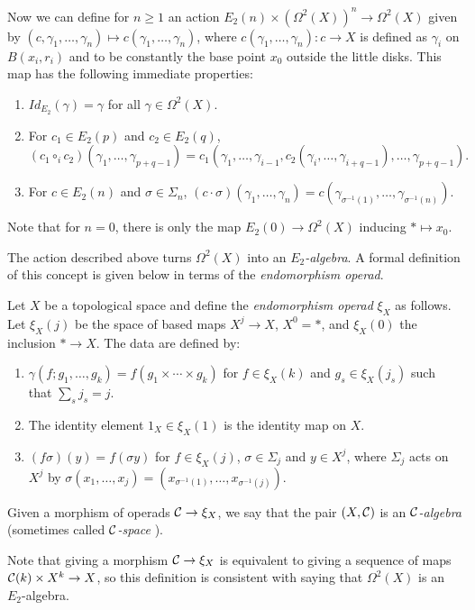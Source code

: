 \documentclass[TFM.tex]{subfiles}
\begin{document}
Now we can define for $n\geq 1$ an action $E_2(n)\times (\Omega^2(X))^n\to \Omega^2(X)$ given by $(c,\gamma_1,\dots, \gamma_n)\mapsto c(\gamma_1,\dots, \gamma_n)$, where 
$c(\gamma_1,\dots, \gamma_n):c\to X$ is defined as $\gamma_i$ on $B(x_i,r_i)$ and to be constantly the base point $x_0$ outside the little disks. This map has the following immediate properties:
\begin{enumerate}
\item $Id_{E_2}(\gamma)=\gamma$ for all $\gamma\in \Omega^2(X)$.
\item For $c_1\in E_2(p)$ and $c_2\in E_2(q)$, 
$$(c_1\circ_i c_2)(\gamma_1,\dots, \gamma_{p+q-1})=c_1(\gamma_1,\dots, \gamma_{i-1}, c_2(\gamma_i,\dots, \gamma_{i+q-1}),\dots, \gamma_{p+q-1}).$$ 
\item For $c\in E_2(n)$ and $\sigma\in\Sigma_n$, $(c\cdot \sigma)(\gamma_1,\dots,\gamma_n)=c(\gamma_{\sigma^{-1}(1)},\dots, \gamma_{\sigma^{-1}(n)})$. 
\end{enumerate}
Note that for $n=0$, there is only the map $E_2(0)\to\Omega^2(X)$ inducing $*\mapsto x_0$. 

The action described above turns $\Omega^2(X)$ into an \emph{$E_2$-algebra}. A formal definition of this concept is given below in terms of the \emph{endomorphism operad}. 


\begin{defi}\label{endomorphism}
Let $X$ be a topological space and define the \emph{endomorphism operad} $\xi_X$ as follows. Let $\xi_X(j)$ be the space of based maps $X^j\to X$, $X^0=*$, and $\xi_X(0)$ the inclusion $*\to X$. The data are defined by:
\begin{enumerate}
\item $\gamma(f;g_1,\dots, g_k)=f(g_1\times\cdots\times g_k)$ for $f\in \xi_X(k)$ and $g_s\in\xi_X(j_s)$ such that $\sum_s j_s=j$.
\item The identity element $1_X\in\xi_X(1)$ is the identity map on $X$.
\item $(f\sigma)(y)=f(\sigma y)$ for $f\in\xi_X(j)$, $\sigma\in\Sigma_j$ and $y\in X^j$, where $\Sigma_j$ acts on $X^j$ by $\sigma(x_1,\dots, x_j)=(x_{\sigma^{-1}(1)},\dots, x_{\sigma^{-1}(j)})$. 
\end{enumerate}

Given a morphism of operads $\mathcal{C}\to \xi_X$, we say that the pair $(X,\mathcal{C})$ is an \emph{$\mathcal{C}$-algebra} (sometimes called \emph{$\mathcal{C}$-space} \cite{May}).
\end{defi}


Note that giving a morphism $\mathcal{C}\to \xi_X$ is equivalent to giving a sequence of maps $\mathcal{C}(k)\times X^k\to X$, so this definition is consistent with saying that $\Omega^2(X)$ is an $E_2$-algebra. 
\end{document}
